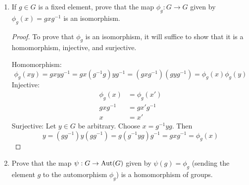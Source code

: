 \documentclass[../psets.tex]{subfiles}
\begin{document}
\begin{enumerate}
\begin{enumerate}
\begin{proof}
            \begin{equation*}
                [\phi\circ\iota](g) = \phi(\iota(g))
                = \phi(g)
                = \iota(\phi(g))
                = [\iota\circ\phi](g)
            \end{equation*}
            Inverses: Since $\phi$ is a bijection, $\phi^{-1}:G\to G$ is a well-defined automorphism in its own right. We can prove in an analogous manner to the above that $\phi\circ\phi^{-1}=\phi^{-1}\circ\phi=e$.\par
            Associativity: Let $f,g,h\in\Aut(G)$ and $x\in G$ be arbitrary. Then
            \begin{equation*}
                [(f\circ g)\circ h](x) = [f\circ g](h(x))
                = f(g(h(x)))
                = f([g\circ h](x))
                = [f\circ(g\circ h)](x)
            \end{equation*}
        \end{proof}
        \item If $g\in G$ is a fixed element, prove that the map $\phi_g:G\to G$ given by $\phi_g(x)=gxg^{-1}$ is an isomorphism.
        \begin{proof}
            To prove that $\phi_g$ is an isomorphism, it will suffice to show that it is a homomorphism, injective, and surjective.\par
            Homomorphism:
            \begin{equation*}
                \phi_g(xy) = gxyg^{-1}
                = gx(g^{-1}g)yg^{-1}
                = (gxg^{-1})(gyg^{-1})
                = \phi_g(x)\phi_g(y)
            \end{equation*}
            Injective:
            \begin{align*}
                \phi_g(x) &= \phi_g(x')\\
                gxg^{-1} &= gx'g^{-1}\\
                x &= x'\tag*{Cancellation Lemma}
            \end{align*}
            Surjective: Let $y\in G$ be arbitrary. Choose $x=g^{-1}yg$. Then
            \begin{equation*}
                y = (gg^{-1})y(gg^{-1})
                = g(g^{-1}yg)g^{-1}
                = gxg^{-1}
                = \phi_g(x)
            \end{equation*}
        \end{proof}
        \item Prove that the map $\psi:G\to\operatorname{Aut}(G)$ given by $\psi(g)=\phi_g$ (sending the element $g$ to the automorphism $\phi_g$) is a homomorphism of groups.

\end{enumerate}
\end{enumerate}
\end{document}
